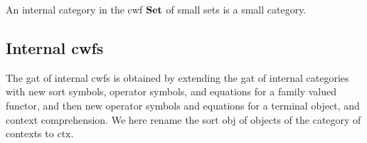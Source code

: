 \documentclass{lmcs}
\def\Obj{\mathrm{obj}}
\def\Hom{\mathrm{hom}}
\def\id{\mathrm{id}}
\newcommand{\ctx}{\mathrm{ctx}}
\begin{document}
An internal category in the cwf ${\bf Set}$ of small sets is a small category.


\subsection{Internal cwfs}\label{gat-cwf}

The gat of internal cwfs is obtained by extending the gat of internal categories with new sort symbols, operator symbols, and equations for a family valued functor, and then new operator symbols and equations for a terminal object, and context comprehension. We here rename the sort $\Obj$ of objects of the category of contexts to $\ctx$.
\end{document}
